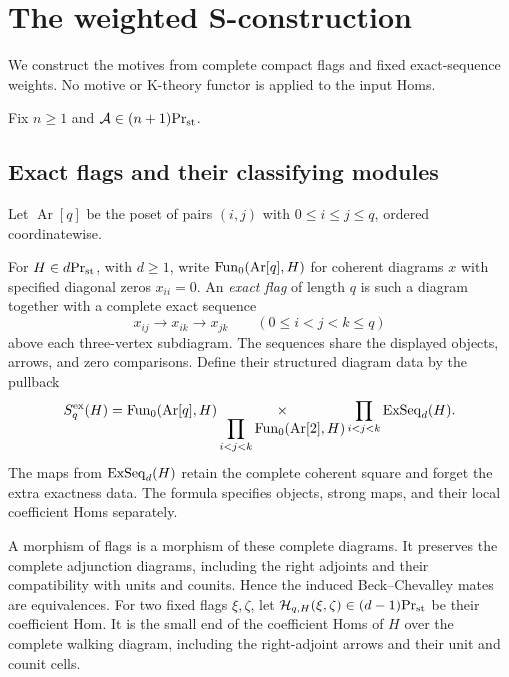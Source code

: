 \section{The weighted S-construction}\label{sec:waldhausen}

We construct the motives from complete compact flags and fixed
exact-sequence weights. No motive or K-theory functor is applied to
the input Homs.

Fix $n\geq1$ and $\mathcal A\in{(n+1)}\mathrm{Pr}_{\mathrm{st}}$.

\subsection{Exact flags and their classifying modules}

Let $\operatorname{Ar}[q]$ be the poset of pairs $(i,j)$ with
$0\leq i\leq j\leq q$, ordered coordinatewise.

\begin{definition}\label{def:exact-flags}
For $H\in{d}\mathrm{Pr}_{\mathrm{st}}$, with $d\geq1$, write
$\operatorname{Fun}_0(\operatorname{Ar}[q],H)$ for coherent diagrams
$x$ with specified diagonal zeros $x_{ii}=0$.
An \emph{exact flag} of length $q$ is such a
diagram together with a complete exact sequence
\[
 x_{ij}\longrightarrow x_{ik}\longrightarrow x_{jk}
       \qquad(0\leq i<j<k\leq q)
\]
above each three-vertex subdiagram. The sequences share the displayed
objects, arrows, and zero comparisons. Define their structured diagram
data by the pullback
\begin{equation}\label{eq:flag-definition-pullback}
 S_q^{\mathrm{ex}}(H)=
 \operatorname{Fun}_0(\operatorname{Ar}[q],H)
 \mathop{\times}_{\displaystyle\prod_{i<j<k}
                  \operatorname{Fun}_0(\operatorname{Ar}[2],H)}
             \prod_{i<j<k}\operatorname{ExSeq}_d(H).
\end{equation}
The maps from $\operatorname{ExSeq}_d(H)$ retain the complete coherent square and
forget the extra exactness data. The
formula specifies objects, strong maps, and their local coefficient
Homs separately.

A morphism of flags is a morphism of these complete diagrams. It preserves the complete adjunction diagrams, including the right adjoints and their compatibility with units and counits. Hence the induced Beck–Chevalley mates are equivalences. For two fixed flags
$\xi,\zeta$, let $\mathcal H_{q,H}(\xi,\zeta)\in{(d-1)}\mathrm{Pr}_{\mathrm{st}}$
be their coefficient Hom. It is the small end of the coefficient
Homs of $H$ over the complete walking diagram, including the
right-adjoint arrows and their unit and counit cells.
\end{definition}

